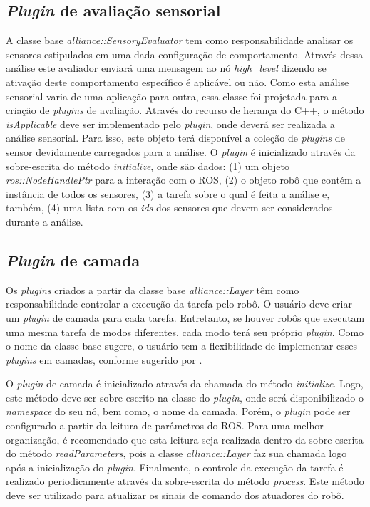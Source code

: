         \subsection{\textit{Plugin} de avaliação sensorial} \label{subsec:alliance_evaluator}
            A classe base \textit{alliance::SensoryEvaluator} tem como responsabilidade analisar os sensores estipulados em uma dada configuração de comportamento. Através dessa análise este avaliador enviará uma mensagem ao nó \textit{high\_level} dizendo se ativação deste comportamento específico é aplicável ou não. Como esta análise sensorial varia de uma aplicação para outra, essa classe foi projetada para a criação de \textit{plugins} de avaliação. Através do recurso de herança do C++, o método \textit{isApplicable} deve ser implementado pelo \textit{plugin}, onde deverá ser realizada a análise sensorial. Para isso, este objeto terá disponível a coleção de \textit{plugins} de sensor devidamente carregados para a análise. O \textit{plugin} é inicializado através da sobre-escrita do método \textit{initialize}, onde são dados: (1) um objeto \textit{ros::NodeHandlePtr} para a interação com o ROS, (2) o objeto robô que contém a instância de todos os sensores, (3) a tarefa sobre o qual é feita a análise e, também, (4) uma lista com os \textit{ids} dos sensores que devem ser considerados durante a análise.
            
            
        
        \subsection{\textit{Plugin} de camada} \label{subsec:alliance_layer}
            Os \textit{plugins} criados a partir da classe base \textit{alliance::Layer} têm como responsabilidade controlar a execução da tarefa pelo robô. O usuário deve criar um \textit{plugin} de camada para cada tarefa. Entretanto, se houver robôs que executam uma mesma tarefa de modos diferentes, cada modo terá seu próprio \textit{plugin}. Como o nome da classe base sugere, o usuário tem a flexibilidade de implementar esses \textit{plugins} em camadas, conforme sugerido por \cite{ref:parker1998alliance}.
            
            
            
            O \textit{plugin} de camada é inicializado através da chamada do método \textit{initialize}. Logo, este método deve ser sobre-escrito na classe do \textit{plugin}, onde será disponibilizado o \textit{namespace} do seu nó, bem como, o nome da camada. Porém, o \textit{plugin} pode ser configurado a partir da leitura de parâmetros do ROS. Para uma melhor organização, é recomendado que esta leitura seja realizada dentro da sobre-escrita do método \textit{readParameters}, pois a classe \textit{alliance::Layer} faz sua chamada logo após a inicialização do \textit{plugin}. Finalmente, o controle da execução da tarefa é realizado periodicamente através da sobre-escrita do método \textit{process}. Este método deve ser utilizado para atualizar os sinais de comando dos atuadores do robô.
            
